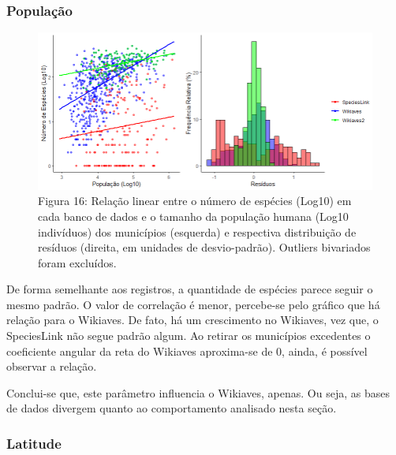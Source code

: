 \subsubsection{População}

 \newpage

\begin{figure}[h!]
\centering
\includegraphics[width = 15cm]{Imagens/G08.png}
\\{\scriptsize Figura 16: Relação linear entre o número de espécies (Log10) em cada banco de dados e o tamanho da população humana (Log10 indivíduos) dos municípios (esquerda) e respectiva distribuição de resíduos (direita, em unidades de desvio-padrão). Outliers bivariados foram excluídos.}
\end{figure}

\begin{resposta}
De forma semelhante aos registros, a quantidade de espécies parece seguir o mesmo padrão. O valor de correlação é menor, percebe-se pelo gráfico que há relação para o Wikiaves. De fato, há um crescimento no Wikiaves, vez que, o SpeciesLink não segue padrão algum. Ao retirar os municípios excedentes o coeficiente angular da reta do Wikiaves aproxima-se de 0, ainda, é possível observar a relação.

Conclui-se que, este parâmetro influencia o Wikiaves, apenas. Ou seja, as bases de dados divergem quanto ao comportamento analisado nesta seção.
\end{resposta}

\subsubsection{Latitude}

 

